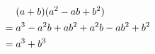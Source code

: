 \begin{align}
&\mathrel{\phantom{=}}
   (a+b)(a^2-ab+b^2) \notag \\
&= a^3 - a^2b + ab^2 + a^2b
   - ab^2 + b^2 \notag \\
&= a^3 + b^3 \label{eq:cubesum}
\end{align}
